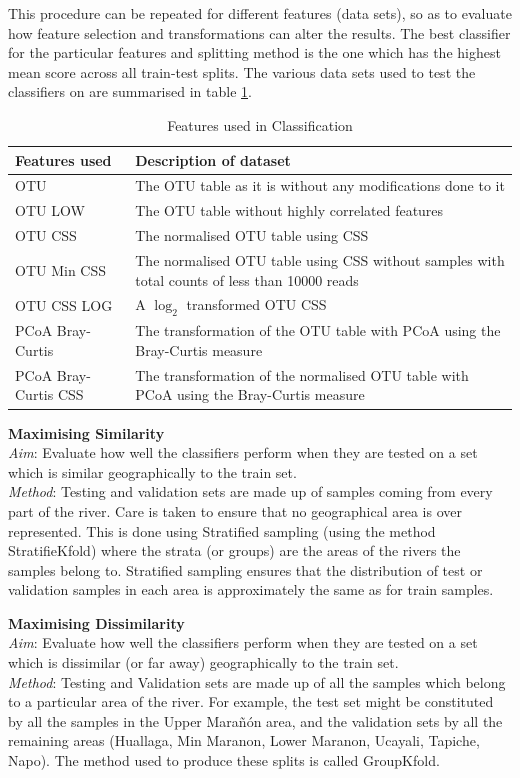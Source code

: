 This procedure can be repeated for different features (data sets), so as to evaluate how feature selection and transformations can alter the results. The best classifier for the particular features and splitting method is the one which has the highest mean score across all train-test splits. The various data sets used to test the classifiers on are summarised in table \ref{table:features}.
\begin{table}
	\caption{Features used in Classification}
	\centering
	\label{table:features}
	\begin{tabularx}{\textwidth}{l X  }
		\hline 
		Features used &Description of dataset\\ 
		
		\hline
		OTU &The OTU table as it is without any modifications done to it \\
		OTU LOW & The OTU table without highly correlated features\\
		OTU CSS & The normalised OTU table using CSS\\
		OTU Min CSS & The normalised OTU table using CSS without samples with total counts of less than 10000 reads  \\
		OTU CSS LOG & A $\log_2$ transformed OTU CSS \\
		PCoA Bray-Curtis &The transformation of the OTU table with PCoA using the Bray-Curtis measure  \\
		PCoA Bray-Curtis CSS &The transformation of the normalised OTU table with PCoA using the Bray-Curtis measure\\
		
		\hline 
	\end{tabularx}
\end{table}

\large{ \bf Maximising Similarity} \\
\textit{Aim}: Evaluate how well the classifiers perform when they are tested on a set which is similar geographically to the train set.\\
\textit{Method}: Testing and validation sets are made up of samples coming from every part of the river. Care is taken to ensure that no geographical area is over represented. This is done using Stratified sampling (using the method StratifieKfold) where the strata (or groups) are the areas of the rivers the samples belong to. Stratified sampling ensures that the distribution of test or validation samples in each area is approximately the same as for train samples.




\large{  \bf Maximising Dissimilarity}\\
\textit{Aim}: Evaluate how well the classifiers perform when they are tested on a set which is dissimilar (or far away) geographically to the train set.\\
\textit{Method}: Testing and Validation sets are made up of all the samples which belong to a particular area of the river. For example, the test set might be constituted by all the samples in the Upper Marañón area, and the validation sets by all the remaining areas (Huallaga, Min Maranon, Lower Maranon, Ucayali, Tapiche, Napo). The method used to produce these splits is called GroupKfold.

